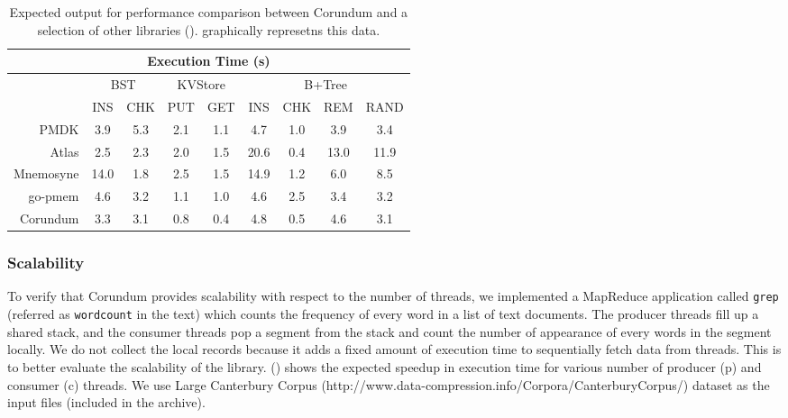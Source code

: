 {\begin{table}
  \center
  \small
  \setlength\tabcolsep{1.5pt}
  \begin{tabular}{|r|c|c|c|c|c|c|c|c|} \hline
    \multicolumn{9}{|c|}{Execution Time (s)}	\\ \hline						
    & \multicolumn{2}{|c|}{BST}	& \multicolumn{2}{|c|}{KVStore}&\multicolumn{4}{|c|}{B+Tree}	     \\\hline	
    & INS&CHK&PUT&GET&INS&CHK&REM&RAND           \\\hline
    PMDK     &3.9&5.3&2.1&1.1&4.7&1.0&3.9&3.4    \\\hline
    Atlas    &2.5&2.3&2.0&1.5&20.6&0.4&13.0&11.9 \\\hline
    Mnemosyne&14.0&1.8&2.5&1.5&14.9&1.2&6.0&8.5  \\\hline
    go-pmem  &4.6&3.2&1.1&1.0&4.6&2.5&3.4&3.2    \\\hline
    Corundum &3.3&3.1&0.8&0.4&4.8&0.5&4.6&3.1    \\\hline
  \end{tabular}
  \caption{Expected output for performance comparison between Corundum and a selection of other libraries ().  graphically represetns this data.}
  \label{tbl:perf}
\end{table}


\subsubsection{Scalability}
To verify that Corundum provides scalability with respect to the number of threads, we implemented a MapReduce application called \verb+grep+ (referred as \verb+wordcount+ in the text) which counts the frequency of every word in a list of text documents. The producer threads fill up a shared stack, and the consumer threads pop a segment from the stack and count the number of appearance of every words in the segment locally. We do not collect the local records because it adds a fixed amount of execution time to sequentially fetch data from threads. This is to better evaluate the scalability of the library.  () shows the expected speedup in execution time for various number of producer (p) and consumer (c) threads. We use Large Canterbury Corpus (http://www.data-compression.info/Corpora/CanterburyCorpus/) dataset as the input files (included in the archive).

\begin{table}[!ht]
  

\end{table}}
